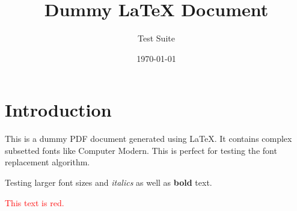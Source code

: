 \documentclass{article}
\title{Dummy LaTeX Document}
\author{Test Suite}
\date{\today}
\begin{document}
\maketitle

\section{Introduction}
This is a dummy PDF document generated using \LaTeX{}. 
It contains complex subsetted fonts like Computer Modern. 
This is perfect for testing the font replacement algorithm.

\vspace{1cm}
{\Large Testing larger font sizes and \textit{italics} as well as \textbf{bold} text.}

\vspace{1cm}
\textcolor{red}{This text is red.}
\end{document}
